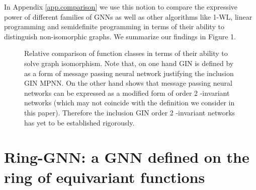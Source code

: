 \documentclass{article}
\begin{document}
In Appendix \ref{app.comparison} we use this notion to compare the expressive power of different families of GNNs as well as other algorithms like 1-WL, linear programming and semidefinite programming in terms of their ability to distinguish non-isomorphic graphs. We summarize our findings in Figure 1.


\begin{figure}[ht]
\label{diagram_main_text}
\small
\centering
{}
\caption{\small Relative comparison of function classes in terms of their ability to solve graph isomorphism.
\newline Note that, on one hand GIN is defined by \cite{xu2018powerful} as a form of message passing neural network justifying the inclusion GIN  MPNN. On the other hand \cite{maron2018invariant} shows that message passing neural networks can be expressed as a modified form of order 2 -invariant networks (which may not coincide with the definition we consider in this paper). 
Therefore the inclusion GIN  order 2 -invariant networks has yet to be established rigorously.
\vspace{-15pt} }
\label{fig.diagram}
\end{figure}















\section{Ring-GNN: a GNN defined on the ring of equivariant functions}
\end{document}
